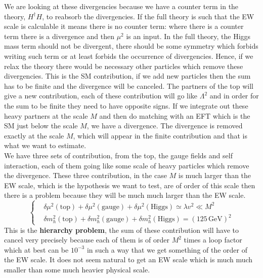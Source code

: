 \documentclass[../main.tex]{subfiles}
\begin{document}
We are looking at these divergencies because we have a counter term in the theory, $H^\dagger H$, to reabsorb the divergencies. If the full theory is such that the EW scale is calculable it means there is no counter term: where there is a counter term there is a divergence and then $\mu^2$ is an input. In the full theory, the Higgs mass term should not be divergent, there should be some symmetry which forbids writing such term or at least forbids the occurrence of divergencies. Hence, if we relax the theory there would be necessary other particles which remove these divergencies. This is the SM contribution, if we add new particles then the sum has to be finite and the divergence will be canceled. The partners of the top will give a new contribution, each of these contribution will go like $\Lambda^2$ and in order for the sum to be finite they need to have opposite signs. If we integrate out these heavy partners at the scale $M$ and then do matching with an EFT which is the SM just below the scale $M$, we have a divergence. The divergence is removed exactly at the scale $M$, which will appear in the finite contribution and that is what we want to estimate.\\
We have three sets of contribution, from the top, the gauge fields and self interaction, each of them going like some scale of heavy particles which remove the divergence. These three contribution, in the case $M$ is much larger than the EW scale, which is the hypothesis we want to test, are of order of this scale then there is a problem because they will be much much larger than the EW scale. 
\[
\left\{
\begin{aligned}
&\delta\mu^2(\text{top})+\delta\mu^2(\text{gauge})+\delta\mu^2(\text{Higgs})\simeq\lambda v^2\ll M^2\\
&\delta m_h^2(\text{top})+\delta m_h^2(\text{gauge})+\delta m_h^2(\text{Higgs})=(125\,\text{GeV})^2
\end{aligned}
\right.
\]
This is the \textbf{hierarchy problem}, the sum of these contribution will have to cancel very precisely because each of them is of order $M^2$ times a loop factor which at best can be $10^{-3}$ in such a way that we get something of the order of the EW scale. It does not seem natural to get an EW scale which is much much smaller than some much heavier physical scale.\\
\end{document}
